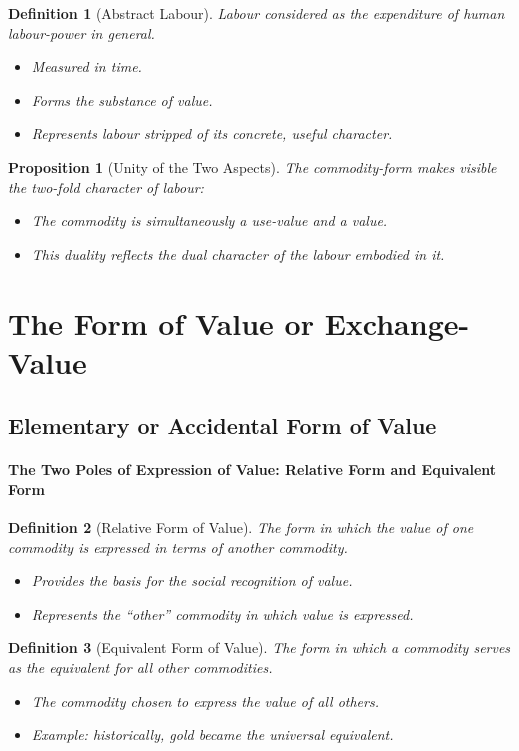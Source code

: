 \documentclass{article}
\newtheorem{innerdef}{Definition}
\newtheorem{innerprop}{Proposition}
\newenvironment{definition}{\begin{innerdef}}{\end{innerdef}}
\newenvironment{proposition}{\begin{innerprop}}{\end{innerprop}}
\begin{document}
\begin{definition}[Abstract Labour]\label{def:1.1.2.2}
Labour considered as the expenditure of human labour-power in general.
\begin{itemize}[noitemsep]
  \item Measured in time.
  \item Forms the substance of value.
  \item Represents labour stripped of its concrete, useful character.
\end{itemize}
\end{definition}

\begin{proposition}[Unity of the Two Aspects]\label{prop:1.1.2.2}
The commodity-form makes visible the two-fold character of labour:
\begin{itemize}[noitemsep]
  \item The commodity is simultaneously a use-value and a value.
  \item This duality reflects the dual character of the labour embodied in it.
\end{itemize}
\end{proposition}

\newpage

\section{The Form of Value or Exchange-Value}

\subsection{Elementary or Accidental Form of Value}

\paragraph{The Two Poles of Expression of Value: Relative Form and Equivalent Form}

\begin{definition}[Relative Form of Value]
The form in which the value of one commodity is expressed in terms of another commodity.
\begin{itemize}[noitemsep]
    \item Provides the basis for the social recognition of value.
    \item Represents the “other” commodity in which value is expressed.
\end{itemize}
\end{definition}

\begin{definition}[Equivalent Form of Value]
The form in which a commodity serves as the equivalent for all other commodities.
\begin{itemize}[noitemsep]
    \item The commodity chosen to express the value of all others.
    \item Example: historically, gold became the universal equivalent.
\end{itemize}
\end{definition}
\end{document}
